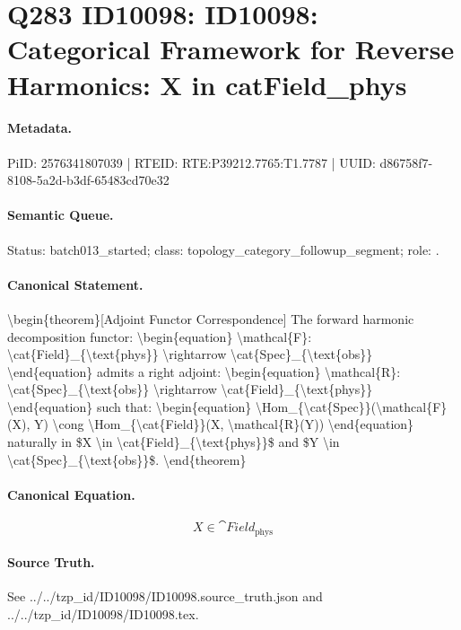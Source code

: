 \section*{Q283 ID10098: ID10098: Categorical Framework for Reverse Harmonics: X in catField\_phys}
\paragraph{Metadata.}
PiID: 2576341807039 | RTEID: RTE:P39212.7765:T1.7787 | UUID: d86758f7-8108-5a2d-b3df-65483cd70e32

\paragraph{Semantic Queue.}
Status: batch013\_started; class: topology\_category\_followup\_segment; role: .

\paragraph{Canonical Statement.}
\textbackslash{}begin\{theorem\}[Adjoint Functor Correspondence] The forward harmonic decomposition functor: \textbackslash{}begin\{equation\} \textbackslash{}mathcal\{F\}: \textbackslash{}cat\{Field\}\_\{\textbackslash{}text\{phys\}\} \textbackslash{}rightarrow \textbackslash{}cat\{Spec\}\_\{\textbackslash{}text\{obs\}\} \textbackslash{}end\{equation\} admits a right adjoint: \textbackslash{}begin\{equation\} \textbackslash{}mathcal\{R\}: \textbackslash{}cat\{Spec\}\_\{\textbackslash{}text\{obs\}\} \textbackslash{}rightarrow \textbackslash{}cat\{Field\}\_\{\textbackslash{}text\{phys\}\} \textbackslash{}end\{equation\} such that: \textbackslash{}begin\{equation\} \textbackslash{}Hom\_\{\textbackslash{}cat\{Spec\}\}(\textbackslash{}mathcal\{F\}(X), Y) \textbackslash{}cong \textbackslash{}Hom\_\{\textbackslash{}cat\{Field\}\}(X, \textbackslash{}mathcal\{R\}(Y)) \textbackslash{}end\{equation\} naturally in \$X \textbackslash{}in \textbackslash{}cat\{Field\}\_\{\textbackslash{}text\{phys\}\}\$ and \$Y \textbackslash{}in \textbackslash{}cat\{Spec\}\_\{\textbackslash{}text\{obs\}\}\$. \textbackslash{}end\{theorem\}

\paragraph{Canonical Equation.}
\[
X \in \cat{Field}_{\text{phys}}
\]

\paragraph{Source Truth.}
See ../../tzp\_id/ID10098/ID10098.source\_truth.json and ../../tzp\_id/ID10098/ID10098.tex.

